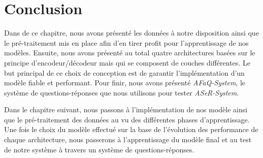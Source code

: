 


\section{Conclusion}
Dans de ce chapitre, nous avons présenté les données à notre disposition ainsi que le pré-traitement mis en place afin d'en tirer profit pour l'apprentissage de nos modèles. Ensuite, nous avons présenté au total quatre architectures basées sur le principe d'encodeur/décodeur mais qui se composent de couches différentes. Le but principal de ce choix de conception est de garantir l'implémentation d'un modèle fiable et performant. Pour finir, nous avons présenté \textit{AFaQ-System}, le système de questions-réponses que nous utilisons pour tester \textit{ASeR-System}.

Dans le chapitre suivant, nous passons à l'implémentation de nos modèle ainsi que le pré-traitement des données au vu des différentes phases d'apprentissage. Une fois le choix du modèle effectué sur la base de l'évolution des performance de chaque architecture, nous passerons à l'apprentissage du modèle final et au test de notre système à travers un système de questions-réponses.